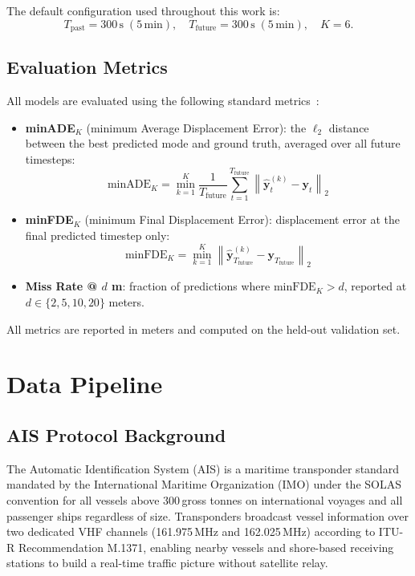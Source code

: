 \documentclass[12pt, a4paper]{article}
\begin{document}
  The default configuration used throughout this work is:
  \[
      T_{\text{past}} = 300\,\text{s}\;(5\,\text{min}),
      \quad T_{\text{future}} = 300\,\text{s}\;(5\,\text{min}),
      \quad K = 6.
  \]

  \subsection{Evaluation Metrics}
  \label{sec:metrics}

  All models are evaluated using the following standard metrics~\citep{feng2024unitraj}:

  \begin{itemize}
      \item \textbf{minADE$_K$} (minimum Average Displacement Error): the $\ell_2$ distance between the best predicted mode and ground truth, averaged over all future timesteps:
      \[
          \text{minADE}_K = \min_{k=1}^{K} \frac{1}{T_{\text{future}}} \sum_{t=1}^{T_{\text{future}}} \left\| \hat{\mathbf{y}}^{(k)}_t - \mathbf{y}_t \right\|_2
      \]

      \item \textbf{minFDE$_K$} (minimum Final Displacement Error): displacement error at the final predicted timestep only:
      \[
          \text{minFDE}_K = \min_{k=1}^{K} \left\| \hat{\mathbf{y}}^{(k)}_{T_{\text{future}}} - \mathbf{y}_{T_{\text{future}}} \right\|_2
      \]


      \item \textbf{Miss Rate @ $d$ m}: fraction of predictions where $\text{minFDE}_K > d$, reported at $d \in \{2, 5, 10, 20\}$ meters.
  \end{itemize}

  All metrics are reported in meters and computed on the held-out validation set.

  \section{Data Pipeline}
  \label{sec:pipeline}


  \subsection{AIS Protocol Background}
  \label{sec:ais_background}

  The Automatic Identification System (AIS) is a maritime transponder standard mandated by
  the International Maritime Organization (IMO) under the SOLAS convention for all vessels
  above 300\,gross tonnes on international voyages and all passenger ships regardless of size.
  Transponders broadcast vessel information over two dedicated VHF channels (161.975\,MHz and
  162.025\,MHz) according to ITU-R Recommendation M.1371, enabling nearby vessels and
  shore-based receiving stations to build a real-time traffic picture without satellite relay.
\end{document}
